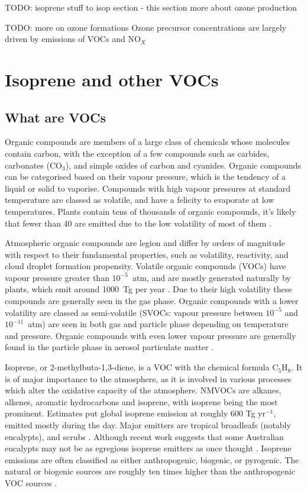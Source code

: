     TODO: isoprene stuff to isop section - this section more about ozone production
    
    TODO: more on ozone formations
    Ozone precursor concentrations are largely driven by emissions of VOCs and NO$_X$
    
    

\section{Isoprene and other VOCs}
  \subsection{What are VOCs}
    Organic compounds are members of a large class of chemicals whose molecules contain carbon, with the exception of a few compounds such as carbides, carbonates (CO$_3$), and simple oxides of carbon and cyanides.
    Organic compounds can be categorised based on their vapour pressure, which is the tendency of a liquid or solid to vaporise.
    Compounds with high vapour pressures at standard temperature are classed as volatile, and have a felicity to evaporate at low temperatures.
    Plants contain tens of thousands of organic compounds, it's likely that fewer than 40 are emitted due to the low volatility of most of them \citep{Guenther2000}.
    
    Atmospheric organic compounds are legion and differ by orders of magnitude with respect to their fundamental properties, such as volatility, reactivity, and cloud droplet formation propensity.
    Volatile organic compounds (VOCs) have vapour pressure greater than $10^{-5}$~atm, and are mostly generated naturally by plants, which emit around 1000~Tg per year \citep{Guenther1995, Glasius2016}.
    Due to their high volatility these compounds are generally seen in the gas phase.
    Organic compounds with a lower volatility are classed as semi-volatile (SVOCs: vapour pressure between $10^{-5}$ and $10^{-11}$~atm) are seen in both gas and particle phase depending on temperature and pressure.
    Organic compounds with even lower vapour pressure are generally found in the particle phase in aerosol particulate matter \citep{Glasius2016}.
    
    Isoprene, or 2-methylbuta-1,3-diene, is a VOC with the chemical formula C$_5$H$_8$. 
    It is of major importance to the atmosphere, as it is involved in various processes which alter the oxidative capacity of the atmosphere.
    NMVOCs are alkanes, alkenes, aromatic hydrocarbons and isoprene, with isoprene being the most prominent.
    Estimates put global isoprene emission at roughly 600 Tg yr$^{-1}$, emitted mostly during the day.
    Major emitters are tropical broadleafs (notably eucalypts), and scrubs \citep{Guenther2006, Arneth2008, Niinemets2010, Monks2015}.
    Although recent work suggests that some Australian eucalypts may not be as egregious isoprene emitters as once thought \citet{Emmerson2016}.
    Isoprene emissions are often classified as either anthropogenic, biogenic, or pyrogenic.
    The natural or biogenic sources are roughly ten times higher than the anthropogenic VOC sources \citep{Guenther2006, Kanakidou2005}.
    
